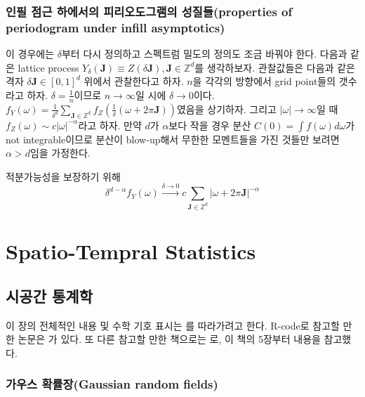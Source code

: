 \documentclass[b5paper,]{scrbook}
\theoremstyle{plain}
\theoremstyle{definition}
\numberwithin{equation}{section}
\begin{document}
\hypertarget{----properties-of-periodogram-under-infill-asymptotics}{%
\section{인필 점근 하에서의 피리오도그램의 성질들(properties of periodogram under infill asymptotics)}\label{----properties-of-periodogram-under-infill-asymptotics}}

이 경우에는 \(\delta\)부터 다시 정의하고 스펙트럼 밀도의 정의도 조금 바꿔야 한다. 다음과 같은 lattice process \(Y_{\delta}(\mathbf{J})\equiv Z(\delta \mathbf{J}), \mathbf{J}\in \mathbb{Z}^{d}\)를 생각하보자. 관찰값들은 다음과 같은 격자 \(\delta \mathbf{J}\in [0,1]^{d}\) 위에서 관찰한다고 하자. \(n\)을 각각의 방향에서 grid point들의 갯수라고 하자. \(\delta = \frac{1}{n}\)이므로 \(n\rightarrow \infty\)일 시에 \(\delta \rightarrow 0\)이다. \(f_{Y}(\omega)=\frac{1}{\delta^{d}}\sum_{\mathbf{J}\in\mathbb{Z}^{d}}f_{Z}(\frac{1}{\delta}(\omega+2\pi\mathbf{J}))\)였음을 상기하자. 그리고 \(|\omega|\rightarrow\infty\)일 때 \(f_{Z}(\omega )\sim c|\omega|^{-\alpha}\)라고 하자. 만약 \(d\)가 \(\alpha\)보다 작을 경우 분산 \(C(0)=\int f(\omega)d\omega\)가 not integrable이므로 분산이 blow-up해서 무한한 모멘트들을 가진 것들만 보려면 \(\alpha >d\)임을 가정한다.

적분가능성을 보장하기 위해
\[\delta^{d-\alpha}f_{Y}(\omega)\stackrel{\delta\rightarrow 0}{\rightarrow}c\sum_{\mathbf{J}\in\mathbb{Z}^{d}}|\omega + 2\pi \mathbf{J}|^{-\alpha}\]

\hypertarget{part-spatio-tempral-statistics}{%
\part{Spatio-Tempral Statistics}\label{part-spatio-tempral-statistics}}

\hypertarget{spatiotemporal}{%
\chapter{시공간 통계학}\label{spatiotemporal}}

이 장의 전체적인 내용 및 수학 기호 표시는 \citep{Cressie2015}를 따라가려고 한다. R-code로 참고할 만한 논문은 \citep{Padoan2015}가 있다. 또 다른 참고할 만한 책으로는 \citep{Montero2015}로, 이 책의 5장부터 내용을 참고했다.

\hypertarget{-gaussian-random-fields}{%
\section{가우스 확률장(Gaussian random fields)}\label{-gaussian-random-fields}}
\end{document}
